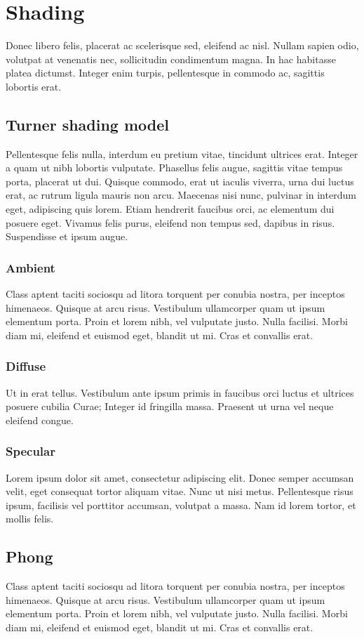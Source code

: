 \chapter{Shading}
Donec libero felis, placerat ac scelerisque sed, eleifend ac nisl. Nullam sapien odio, volutpat at venenatis nec, sollicitudin condimentum magna. In hac habitasse platea dictumst. Integer enim turpis, pellentesque in commodo ac, sagittis lobortis erat.
\section{Turner shading model}
Pellentesque felis nulla, interdum eu pretium vitae, tincidunt ultrices erat. Integer a quam ut nibh lobortis vulputate. Phasellus felis augue, sagittis vitae tempus porta, placerat ut dui. Quisque commodo, erat ut iaculis viverra, urna dui luctus erat, ac rutrum ligula mauris non arcu. Maecenas nisi nunc, pulvinar in interdum eget, adipiscing quis lorem. Etiam hendrerit faucibus orci, ac elementum dui posuere eget. Vivamus felis purus, eleifend non tempus sed, dapibus in risus. Suspendisse et ipsum augue.
\subsection{Ambient}
Class aptent taciti sociosqu ad litora torquent per conubia nostra, per inceptos himenaeos. Quisque at arcu risus. Vestibulum ullamcorper quam ut ipsum elementum porta. Proin et lorem nibh, vel vulputate justo. Nulla facilisi. Morbi diam mi, eleifend et euismod eget, blandit ut mi. Cras et convallis erat. 
\subsection{Diffuse}
Ut in erat tellus. Vestibulum ante ipsum primis in faucibus orci luctus et ultrices posuere cubilia Curae; Integer id fringilla massa. Praesent ut urna vel neque eleifend congue. 
\subsection{Specular}
Lorem ipsum dolor sit amet, consectetur adipiscing elit. Donec semper accumsan velit, eget consequat tortor aliquam vitae. Nunc ut nisi metus. Pellentesque risus ipsum, facilisis vel porttitor accumsan, volutpat a massa. Nam id lorem tortor, et mollis felis.
\section{Phong}
Class aptent taciti sociosqu ad litora torquent per conubia nostra, per inceptos himenaeos. Quisque at arcu risus. Vestibulum ullamcorper quam ut ipsum elementum porta. Proin et lorem nibh, vel vulputate justo. Nulla facilisi. Morbi diam mi, eleifend et euismod eget, blandit ut mi. Cras et convallis erat. 
